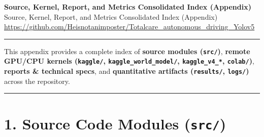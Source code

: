 \documentclass[10.5pt,a4paper]{article}
\begin{document}
\begin{center}
{\LARGE\bfseries Source, Kernel, Report, and Metrics Consolidated Index (Appendix)}\\[6pt]
{\normalsize\color{gray} Source, Kernel, Report, and Metrics Consolidated Index (Appendix)}\\[4pt]
{\small\href{https://github.com/Heisnotanimposter/Totalcare_autonomous_driving_Yolov5}{https://github.com/Heisnotanimposter/Totalcare\_autonomous\_driving\_Yolov5}}
\end{center}
\vspace{4pt}
\hrule
\vspace{8pt}

This appendix provides a complete index of \textbf{source modules (\texttt{src/\allowbreak{}})}, \textbf{remote GPU/CPU kernels (\texttt{kaggle/\allowbreak{}}, \texttt{kaggle\_\allowbreak{}world\_\allowbreak{}model/\allowbreak{}}, \texttt{kaggle\_\allowbreak{}v4\_\allowbreak{}*}, \texttt{colab/\allowbreak{}})}, \textbf{reports \& technical specs}, and \textbf{quantitative artifacts (\texttt{results/\allowbreak{}}, \texttt{logs/\allowbreak{}})} across the repository.


\par\noindent\rule{\textwidth}{0.4pt}\par\medskip

\section{1. Source Code Modules (\texttt{src/\allowbreak{}})}
\end{document}
